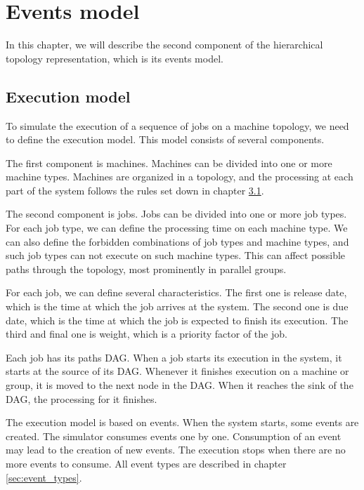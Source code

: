 \chapter{Events model}
\label{sec:events_model}

In this chapter, we will describe the second component of the hierarchical topology representation, which is its events model.

\section{Execution model}
\label{sec:execution_model}

To simulate the execution of a sequence of jobs on a machine topology, we need to define the execution model. This model consists of several components.

The first component is machines. Machines can be divided into one or more machine types. Machines are organized in a topology, and the processing at each part of the system follows the rules set down in chapter \hyperref[sec:topology_model]{3.1}.

The second component is jobs. Jobs can be divided into one or more job types. For each job type, we can define the processing time on each machine type. We can also define the forbidden combinations of job types and machine types, and such job types can not execute on such machine types. This can affect possible paths through the topology, most prominently in parallel groups.

For each job, we can define several characteristics. The first one is release date, which is the time at which the job arrives at the system. The second one is due date, which is the time at which the job is expected to finish its execution. The third and final one is weight, which is a priority factor of the job.

Each job has its paths DAG. When a job starts its execution in the system, it starts at the source of its DAG. Whenever it finishes execution on a machine or group, it is moved to the next node in the DAG. When it reaches the sink of the DAG, the processing for it finishes.

The execution model is based on events. When the system starts, some events are created. The simulator consumes events one by one. Consumption of an event may lead to the creation of new events. The execution stops when there are no more events to consume. All event types are described in chapter \ref{sec:event_types}.

